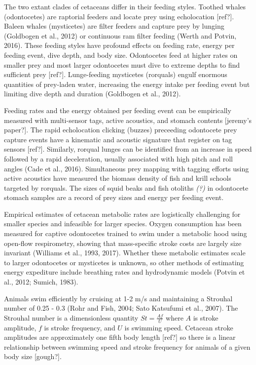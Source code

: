 \documentclass[]{elsarticle} %
\begin{document}
The two extant clades of cetaceans differ in their feeding styles.
Toothed whales (odontocetes) are raptorial feeders and locate prey using
echolocation {[}ref?{]}. Baleen whales (mysticetes) are filter feeders
and capture prey by lunging (Goldbogen et al., 2012) or continuous ram
filter feeding (Werth and Potvin, 2016). These feeding styles have
profound effects on feeding rate, energy per feeding event, dive depth,
and body size. Odontocetes feed at higher rates on smaller prey and most
larger odontocetes must dive to extreme depths to find sufficient prey
{[}ref?{]}. Lunge-feeding mysticetes (rorquals) engulf enormous
quantities of prey-laden water, increasing the energy intake per feeding
event but limiting dive depth and duration (Goldbogen et al., 2012).

Feeding rates and the energy obtained per feeding event can be
empirically measured with multi-sensor tags, active acoustics, and
stomach contents {[}jeremy's paper?{]}. The rapid echolocation clicking
(buzzes) preceeding odontocete prey capture events have a kinematic and
acoustic signature that register on tag sensors {[}ref?{]}. Similarly,
rorqual lunges can be identified from an increase in speed followed by a
rapid deceleration, usually associated with high pitch and roll angles
(Cade et al., 2016). Simultaneous prey mapping with tagging efforts
using active acoustics have measured the biomass density of fish and
krill schools targeted by rorquals. The sizes of squid beaks and fish
otoliths \emph{(?)} in odontocete stomach samples are a record of prey
sizes and energy per feeding event.

Empirical estimates of cetacean metabolic rates are logistically
challenging for smaller species and infeasible for larger species.
Oxygen consumption has been measured for captive odontocetes trained to
swim under a metabolic hood using open-flow respirometry, showing that
mass-specific stroke costs are largely size invariant (Williams et al.,
1993, 2017). Whether these metabolic estimates scale to larger
odontocetes or mysticetes is unknown, so other methods of estimating
energy expediture include breathing rates and hydrodynamic models
(Potvin et al., 2012; Sumich, 1983).

Animals swim efficiently by cruising at 1-2 m/s and maintaining a
Strouhal number of 0.25 - 0.3 (Rohr and Fish, 2004; Sato Katsufumi et
al., 2007). The Strouhal number is a dimensionless quantity
\(St = \frac{Af}{U}\) where \(A\) is stroke amplitude, \(f\) is stroke
frequency, and \(U\) is swimming speed. Cetacean stroke amplitudes are
approximately one fifth body length {[}ref?{]} so there is a linear
relationship between swimming speed and stroke frequency for animals of
a given body size {[}gough?{]}.
\end{document}
